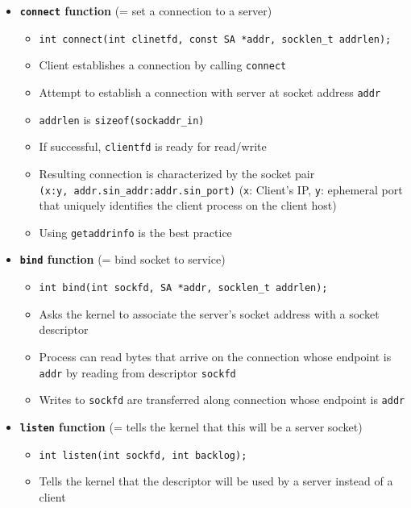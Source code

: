 \documentclass[12pt]{article}
\begin{document}
{\begin{itemize}
\begin{itemize}
\begin{itemize}
			\item Returns non-negative descriptor, only partially opened and cannot yet be used for reading and writing
			\item This function is \textit{protocol specific}. Use \texttt{getaddrinfo}
		\end{itemize}
		\item \textbf{\texttt{connect} function} (= set a connection to a server)
		\begin{itemize}
			\item \texttt{int connect(int clinetfd, const SA *addr, socklen\_t addrlen);}
			\item Client establishes a connection by calling \texttt{connect}
			\item Attempt to establish a connection with server at socket address \texttt{addr}
			\item \texttt{addrlen} is \texttt{sizeof(sockaddr\_in)}
			\item If successful, \texttt{clientfd} is ready for read/write
			\item Resulting connection is characterized by the socket pair\\
			\texttt{(x:y, addr.sin\_addr:addr.sin\_port)} (\texttt{x}: Client's IP, \texttt{y}: ephemeral port that uniquely identifies the client process on the client host)
			\item Using \texttt{getaddrinfo} is the best practice
		\end{itemize}
		\item \textbf{\texttt{bind} function} (= bind socket to service)
		\begin{itemize}
			\item \texttt{int bind(int sockfd, SA *addr, socklen\_t addrlen);}
			\item Asks the kernel to associate the server's socket address with a socket descriptor
			\item Process can read bytes that arrive on the connection whose endpoint is \texttt{addr} by reading from descriptor \texttt{sockfd}
			\item Writes to \texttt{sockfd} are transferred along connection whose endpoint is \texttt{addr}
		\end{itemize}
		\item \textbf{\texttt{listen} function} (= tells the kernel that this will be a server socket)
		\begin{itemize}
			\item \texttt{int listen(int sockfd, int backlog);}
			\item Tells the kernel that the descriptor will be used by a server instead of a client

\end{itemize}
\end{itemize}
\end{itemize}}
\end{document}
